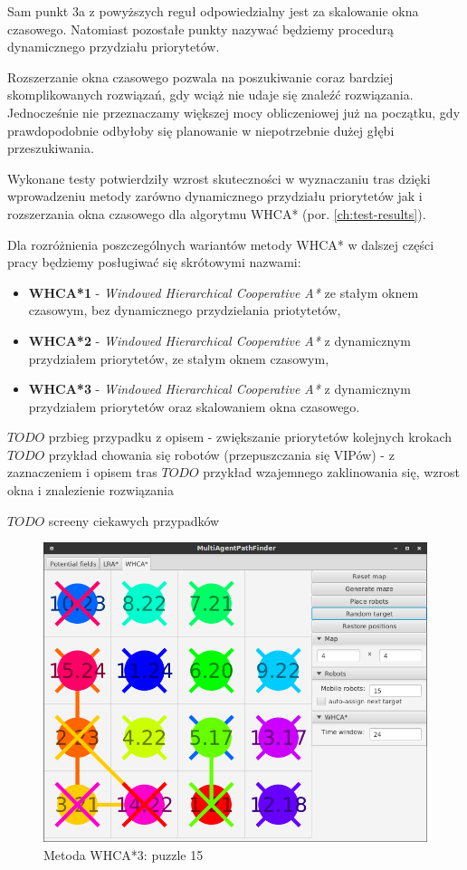 Sam punkt 3a z powyższych reguł odpowiedzialny jest za skalowanie okna czasowego. Natomiast pozostałe punkty nazywać będziemy procedurą dynamicznego przydziału priorytetów.

Rozszerzanie okna czasowego pozwala na poszukiwanie coraz bardziej skomplikowanych rozwiązań, gdy wciąż nie udaje się znaleźć rozwiązania. Jednocześnie nie przeznaczamy większej mocy obliczeniowej już na początku, gdy prawdopodobnie odbyłoby się planowanie w niepotrzebnie dużej głębi przeszukiwania.

Wykonane testy potwierdziły wzrost skuteczności w wyznaczaniu tras dzięki wprowadzeniu metody zarówno dynamicznego przydziału priorytetów jak i rozszerzania okna czasowego dla algorytmu WHCA* (por. \ref{ch:test-results}).

Dla rozróżnienia poszczególnych wariantów metody WHCA* w dalszej części pracy będziemy posługiwać się skrótowymi nazwami:
\begin{itemize}
	\item {\bf WHCA*1} - {\it Windowed Hierarchical Cooperative A*} ze stałym oknem czasowym, bez dynamicznego przydzielania priotytetów,
	\item {\bf WHCA*2} - {\it Windowed Hierarchical Cooperative A*} z dynamicznym przydziałem priorytetów, ze stałym oknem czasowym,
	\item {\bf WHCA*3} - {\it Windowed Hierarchical Cooperative A*} z dynamicznym przydziałem priorytetów oraz skalowaniem okna czasowego.
\end{itemize}

$TODO$ przbieg przypadku z opisem - zwiększanie priorytetów kolejnych krokach
$TODO$ przykład chowania się robotów (przepuszczania się VIPów) - z zaznaczeniem i opisem tras
$TODO$ przykład wzajemnego zaklinowania się, wzrost okna i znalezienie rozwiązania

$TODO$ screeny ciekawych przypadków
\begin{figure}
	\centering
	\includegraphics[width=0.8\columnwidth]{img/robopath/puzzle-15}
	\caption{Metoda WHCA*3: puzzle 15}
	\label{fig:test-puzzle-15}
\end{figure}